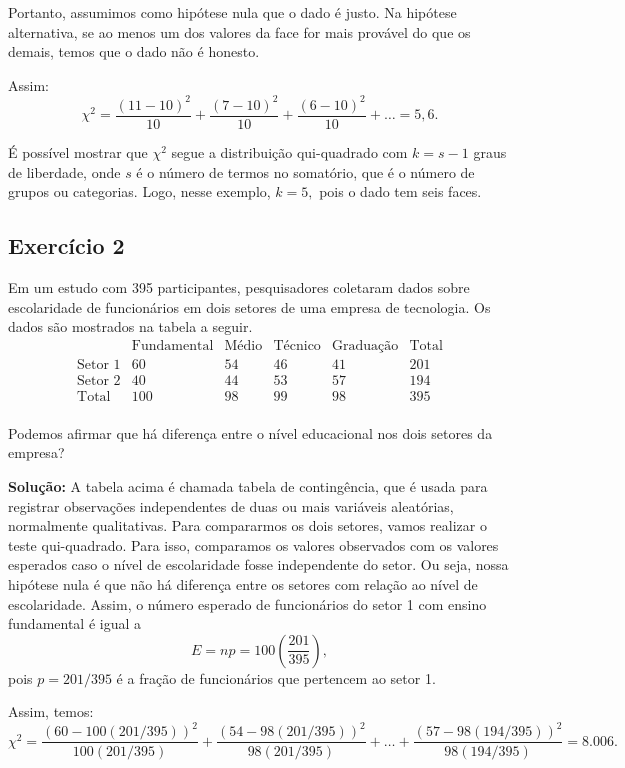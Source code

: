 \documentclass{article}
\begin{document}
Portanto, assumimos como hipótese nula que o dado é justo. Na hipótese alternativa, se ao menos um dos valores da face for mais provável do que os demais, temos que o dado não é honesto.

Assim:
    $$
    \chi^2 = \frac{(11 - 10)^2}{10} + \frac{(7 - 10)^2}{10} + \frac{(6 - 10)^2}{10} + \ldots = 5,6.
    $$

É possível mostrar que $\chi^2$ segue a distribuição qui-quadrado com $k = s - 1$ graus de liberdade, onde $s$ é o número de termos no somatório, que é o número de grupos ou categorias. Logo, nesse exemplo, $k = 5,$ pois o dado tem seis faces.

\subsection{Exercício 2}
Em um estudo com 395 participantes, pesquisadores coletaram dados sobre escolaridade de funcionários em dois setores de uma empresa de tecnologia. Os dados são mostrados na tabela a seguir.
    $$
    \begin{array}{l|c|c|c|c|c}
     & \text{Fundamental} & \text{Médio} & \text{Técnico} & \text{Graduação} & \text{Total}\\ \hline
    \text{Setor 1} & 60 & 54 & 46 & 41 & 201\\
    \text{Setor 2} & 40 & 44 & 53 & 57 & 194\\
    \text{Total} & 100 & 98 & 99 & 98 & 395\\
    \end{array}
    $$

Podemos afirmar que há diferença entre o nível educacional nos dois setores da empresa?

\vspace{0.5cm}
\textbf{Solução:}
A tabela acima é chamada tabela de contingência, que é usada para registrar observações independentes de duas ou mais variáveis aleatórias, normalmente qualitativas.
Para compararmos os dois setores, vamos realizar o teste qui-quadrado. Para isso, comparamos os valores observados com os valores esperados caso o nível de escolaridade fosse independente do setor.
Ou seja, nossa hipótese nula é que não há diferença entre os setores com relação ao nível de escolaridade. Assim, o número esperado de funcionários do setor 1 com ensino fundamental é igual a
    $$
    E = np = 100\left(\frac{201}{395}\right),
    $$
pois $p = 201/395$ é a fração de funcionários que pertencem ao setor 1.

Assim, temos:
    $$
    \chi^2 = \frac{(60-100(201/395))^2}{100(201/395)} + 
    \frac{(54-98(201/395))^2}{98(201/395)} + 
    \ldots +
    \frac{(57-98(194/395))^2}{98(194/395)} = 8.006.
    $$
\end{document}
